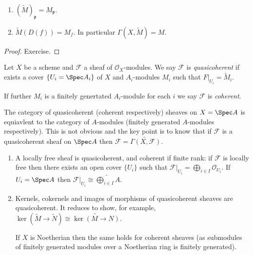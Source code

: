 \documentclass[a4paper]{article}
\newcommand{\sh}[1]{\mathcal{#1}} %
\begin{document}
\begin{proposition}\leavevmode
  \begin{enumerate}
  \item \((\widetilde M)_{\mathfrak p} = M_{\mathfrak p}\).
  \item \(\widetilde M(D(f)) = M_f\). In particular \(\Gamma(X, \widetilde M) = M\).
  \end{enumerate}
\end{proposition}

\begin{proof}
  Exercise.
\end{proof}

\begin{definition}
  Let \(X\) be a scheme and \(\sh F\) a sheaf of \(\sh O_X\)-modules. We say \(\sh F\) is \emph{quasicoherent} if exists a cover \(\{U_i = \Spec A_i\}\) of \(X\) and \(A_i\)-modules \(M_i\) such that \(F|_{U_i} = \widetilde M_i\).

  If further \(M_i\) is a finitely genertated \(A_i\)-module for each \(i\) we say \(\sh F\) is \emph{coherent}.
\end{definition}

\begin{remark}
  The category of quasicoherent (coherent respectively) sheaves on \(X = \Spec A\) is equiavlent to the category of \(A\)-modules (finitely generated \(A\)-modules respectively). This is not obvious and the key point is to know that if \(\sh F\) is a quasicoherent sheaf on \(\Spec A\) then \(\sh F = \widetilde{\Gamma(X, \sh F)}\).
\end{remark}

\begin{eg}\leavevmode
  \begin{enumerate}
  \item A locally free sheaf is quasicoherent, and coherent if finite rank: if \(\sh F\) is locally free then there exists an open cover \(\{U_i\}\) such that \(\sh F|_{U_i} = \bigoplus_{i \in I} \sh O_{U_i}\). If \(U_i = \Spec A\) then \(\sh F|_{U_i} \cong \widetilde{\bigoplus_{i \in I} A}\).
  \item Kernels, cokernels and images of morphisms of quasicoherent sheaves are quasicoherent. It reduces to show, for example, \(\ker(\widetilde M \to \widetilde N) \cong \widetilde{\ker(M \to N)}\).

    If \(X\) is Noetherian then the same holds for coherent sheaves (as submodules of finitely generated modules over a Noetherian ring is finitely generated).
  \end{enumerate}
\end{eg}
\end{document}
